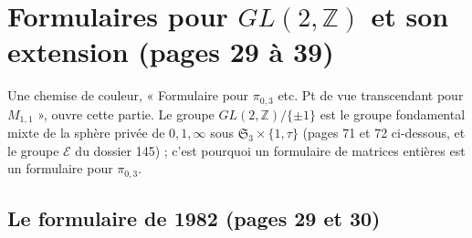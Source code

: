 \documentclass[11pt,a4paper]{article}
\begin{document}
\section*{Formulaires pour $GL(2, \mathbb{Z})$ et son extension (pages 29 à 39)}

Une chemise de couleur, « Formulaire pour $\pi_{0,3}$ etc. Pt de vue
transcendant pour $M_{1,1}$ », ouvre cette partie. Le groupe
$GL(2, \mathbb{Z})/\{\pm 1\}$ est le groupe fondamental mixte de la sphère privée
de $0, 1, \infty$ sous $\mathfrak{S}_3 \times \{1, \tau\}$ (pages 71 et 72
ci-dessous, et le groupe $\mathcal{E}$ du dossier 145) ; c'est pourquoi un
formulaire de matrices entières est un formulaire pour $\pi_{0,3}$.

\subsection*{Le formulaire de 1982 (pages 29 et 30)}
\end{document}
